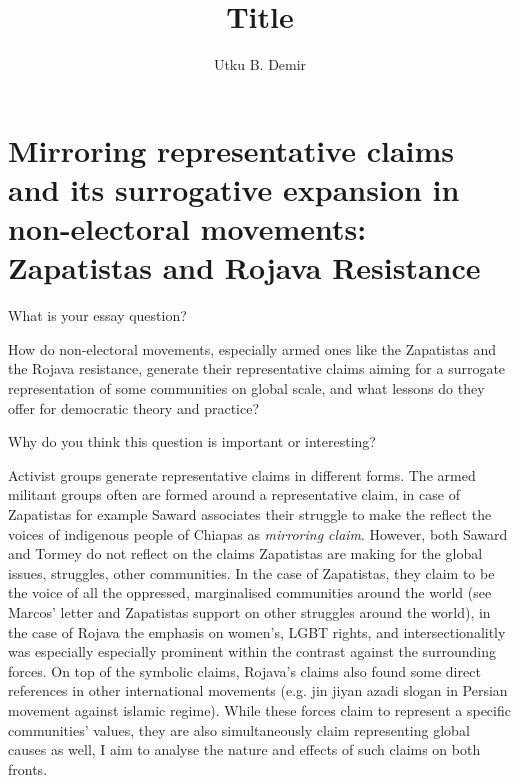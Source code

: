 
\title{Title}
\author{Utku B. Demir}


\maketitle

\section{Mirroring representative claims and its surrogative expansion in
  non-electoral movements: Zapatistas and Rojava Resistance}

What is your essay question?

How do non-electoral movements, especially armed ones like the Zapatistas and the Rojava resistance, generate their representative claims aiming for a surrogate representation of some communities on global scale, and what lessons do they offer for democratic theory and practice?

Why do you think this question is important or interesting?

Activist groups generate representative claims in different forms. The
armed militant groups often are formed around a representative claim, in
case of Zapatistas for example Saward \parencite[13]{saward2010}
associates their struggle to make the reflect the voices of indigenous
people of Chiapas as \textit{mirroring claim}. However,  both Saward and
Tormey \parencite[]{tormey2006} do not reflect on the claims
Zapatistas are making for the global issues, struggles, other
communities. In the case of Zapatistas, they claim to be the voice of all
the oppressed, marginalised communities around the world (see Marcos'
letter and Zapatistas support on other struggles around the world), in
the case of Rojava the emphasis on women's, LGBT rights, and
intersectionalitly was especially especially prominent within the contrast against
the surrounding forces. On top of the symbolic claims, Rojava's claims
also found some direct references in other international movements (e.g.
jin jiyan azadi slogan in Persian movement against islamic regime). While
these forces claim to represent a specific communities' values, they are
also simultaneously claim representing global causes as well, I aim to
analyse the nature and effects of such claims on both fronts.




